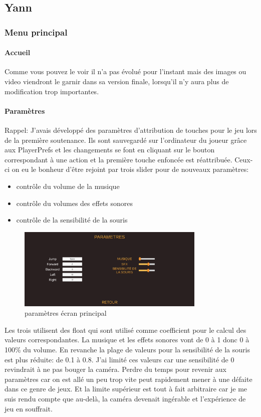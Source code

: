 \documentclass{article}
\begin{document}
\newpage
\subsection{Yann}

\subsubsection{Menu principal}

\paragraph{Accueil}
Comme vous pouvez le voir il n'a pas évolué pour l'instant mais des images ou video viendront le garnir dans sa version finale, lorsqu'il n'y aura plus de modification trop importantes.
\paragraph{Paramètres}
Rappel: J'avais développé des paramètres d'attribution de touches pour le jeu lors de la première soutenance. Ils sont sauvegardé sur l'ordinateur du joueur grâce aux PlayerPrefs et les changements se font en cliquant sur le bouton correspondant à une action et la première touche enfoncée est réattribuée.
Ceux-ci on eu le bonheur d'être rejoint par trois slider pour de nouveaux paramètres:

\begin{itemize}
    \item contrôle du volume de la musique
    \item contrôle du volumes des effets sonores
    \item contrôle de la sensibilité de la souris
\end{itemize}

\begin{figure}[!h]
    \centering
    \includegraphics[width=0.8\textwidth]{parametres.png}
    \caption{paramètres écran principal}
\end{figure}

Les trois utilisent des float qui sont utilisé comme coefficient pour le calcul des valeurs correspondantes. La musique et les effets sonores vont de 0 à 1 donc 0 à 100\% du volume. En revanche la plage de valeurs pour la sensibilité de la souris est plus réduite: de 0.1 à 0.8. J'ai limité ces valeurs car une sensibilité de 0 revindrait à ne pas bouger la caméra. Perdre du temps pour revenir aux paramètres car on est allé un peu trop vite peut rapidement mener à une défaite dans ce genre de jeux. Et la limite supérieur est tout à fait arbitraire car je me suis rendu compte que au-delà, la caméra devenait ingérable et l'expérience de jeu en souffrait.
\end{document}
